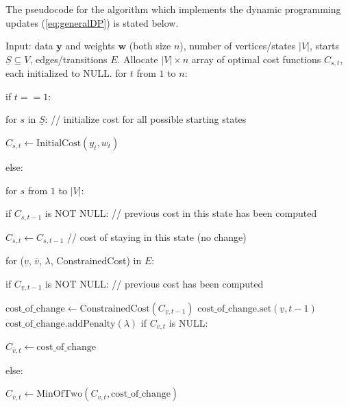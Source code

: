 \documentclass[article]{jss}
\begin{document}
The pseudocode for the algorithm which implements the dynamic
programming updates (\ref{eq:generalDP}) is stated below.
\begin{algorithm}[H]
\begin{algorithmic}[1]
\STATE Input: data $\mathbf y$ and weights $\mathbf w$ (both size $n$), 
number of vertices/states $|V|$, starts $\underline S\subseteq V$, 
edges/transitions $E$.
\STATE Allocate $|V|\times n$ array of optimal cost functions $C_{s,t}$, 
each initialized to NULL.
\STATE for $t$ from $1$ to $n$:
\begin{ALC@g}
  \STATE if $t==1$:
  \begin{ALC@g}
    \STATE for $s$ in $\underline S$: // initialize cost for all possible starting states
    \begin{ALC@g}
      \STATE $C_{s,t}\gets\text{InitialCost}(y_t, w_t)$
    \end{ALC@g}
  \end{ALC@g}
  \STATE else:
  \begin{ALC@g}
    \STATE for $s$ from $1$ to $|V|$: 
    \begin{ALC@g}
      \STATE if $C_{s,t-1}$ is NOT NULL: // previous cost in this state has been computed
      \begin{ALC@g}
        \STATE $C_{s,t}\gets C_{s,t-1}$ // cost of staying in this state (no change)
      \end{ALC@g}
    \end{ALC@g}
    \STATE for ($\underline v$, $\overline v$, $\lambda$,
    ConstrainedCost) in $E$:
    \begin{ALC@g}
      \STATE if $C_{\underline v,t-1}$ is NOT NULL: // previous cost has been computed
      \begin{ALC@g}
        \STATE
        $\text{cost\_of\_change}\gets
        \text{ConstrainedCost}(C_{\underline v, t-1})$
        \STATE
        $\text{cost\_of\_change.set}
        (\underline v, t-1)$
        \STATE
        $\text{cost\_of\_change.addPenalty}
        (\text{$\lambda$})$
        \STATE if $C_{\overline v,t}$ is NULL:
        \begin{ALC@g}
          \STATE $C_{\overline v,t}\gets\text{cost\_of\_change}$
        \end{ALC@g}
        \STATE else:
        \begin{ALC@g}
          \STATE
          $C_{\overline v,t}\gets \text{MinOfTwo}(C_{\overline v,t},
          \text{cost\_of\_change})$
        \end{ALC@g}
      \end{ALC@g}

\end{ALC@g}
\end{ALC@g}
\end{ALC@g}
\end{algorithmic}
\end{algorithm}
\end{document}
